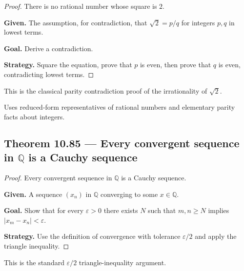 \begin{proof}
\Claim There is no rational number whose square is $2$.

\textbf{Given.} The assumption, for contradiction, that $\sqrt{2}=p/q$ for integers $p,q$ in lowest terms.

\textbf{Goal.} Derive a contradiction.

\textbf{Strategy.} Square the equation, prove that $p$ is even, then prove that $q$ is even, contradicting lowest terms.


\end{proof}

\begin{remark*}
This is the classical parity contradiction proof of the irrationality of
$\sqrt{2}$.
\end{remark*}

\begin{remark*}[Dependencies]
Uses reduced-form representatives of rational numbers and elementary parity
facts about integers.
\end{remark*}


\subsection*{Theorem 10.85 — Every convergent sequence in $\mathbb{Q}$ is a Cauchy sequence}
\label{prf:grep-convergent-implies-cauchy}

\begin{proof}
\Claim Every convergent sequence in $\mathbb{Q}$ is a Cauchy sequence.

\textbf{Given.} A sequence $(x_n)$ in $\mathbb{Q}$ converging to some $x \in \mathbb{Q}$.

\textbf{Goal.} Show that for every $\varepsilon>0$ there exists $N$ such that $m,n\ge N$ implies $|x_m-x_n|<\varepsilon$.

\textbf{Strategy.} Use the definition of convergence with tolerance $\varepsilon/2$ and apply the triangle inequality.


\end{proof}

\begin{remark*}
This is the standard $\varepsilon/2$ triangle-inequality argument.
\end{remark*}

